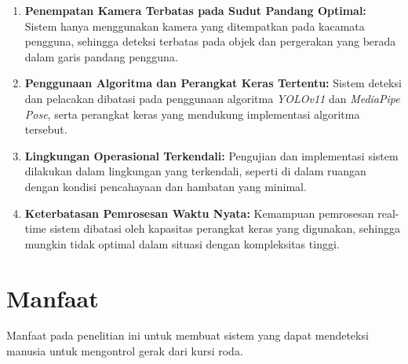 \begin{enumerate}[nolistsep]
      \item \textbf{Penempatan Kamera Terbatas pada Sudut Pandang Optimal:} Sistem hanya menggunakan kamera yang ditempatkan pada kacamata pengguna, sehingga deteksi terbatas pada objek dan pergerakan yang berada dalam garis pandang pengguna.
      \item \textbf{Penggunaan Algoritma dan Perangkat Keras Tertentu:} Sistem deteksi dan pelacakan dibatasi pada penggunaan algoritma \emph{YOLOv11} dan\emph{ MediaPipe Pose}, serta perangkat keras yang mendukung implementasi algoritma tersebut.
      \item \textbf{Lingkungan Operasional Terkendali:} Pengujian dan implementasi sistem dilakukan dalam lingkungan yang terkendali, seperti di dalam ruangan dengan kondisi pencahayaan dan hambatan yang minimal.
      \item \textbf{Keterbatasan Pemrosesan Waktu Nyata:} Kemampuan pemrosesan real-time sistem dibatasi oleh kapasitas perangkat keras yang digunakan, sehingga mungkin tidak optimal dalam situasi dengan kompleksitas tinggi.
\end{enumerate}

\section{Manfaat}
\label{sec:manfaat}

Manfaat pada penelitian ini untuk membuat sistem yang dapat mendeteksi manusia untuk mengontrol gerak dari kursi roda.
